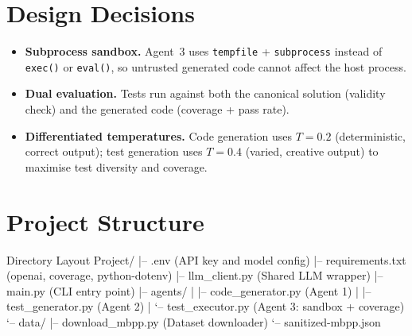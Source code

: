 \documentclass[12pt, a4paper]{article}
\begin{document}



\section{Design Decisions}
\label{sec:design}

\begin{itemize}[leftmargin=18pt, itemsep=5pt]

  \item \textbf{Subprocess sandbox.} Agent~3 uses \texttt{tempfile} +
        \texttt{subprocess} instead of \texttt{exec()} or \texttt{eval()}, so
        untrusted generated code cannot affect the host process.

  \item \textbf{Dual evaluation.} Tests run against both the canonical solution
        (validity check) and the generated code (coverage + pass rate).

  \item \textbf{Differentiated temperatures.} Code generation uses $T=0.2$
        (deterministic, correct output); test generation uses $T=0.4$ (varied,
        creative output) to maximise test diversity and coverage.

\end{itemize}


\section{Project Structure}
\label{sec:structure}

\begin{outputbox}{Directory Layout}
Project/
|-- .env                   (API key and model config)
|-- requirements.txt       (openai, coverage, python-dotenv)
|-- llm_client.py          (Shared LLM wrapper)
|-- main.py                (CLI entry point)
|-- agents/
|   |-- code_generator.py  (Agent 1)
|   |-- test_generator.py  (Agent 2)
|   `-- test_executor.py   (Agent 3: sandbox + coverage)
`-- data/
    |-- download_mbpp.py   (Dataset downloader)
    `-- sanitized-mbpp.json
\end{outputbox}
\end{document}
